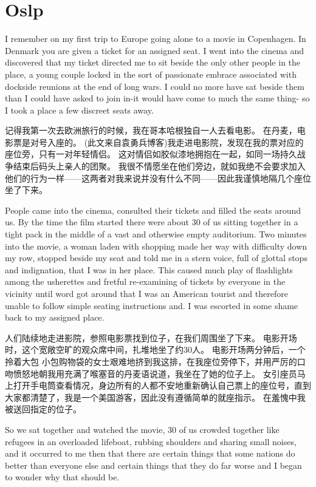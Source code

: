\documentclass[cs4size, a4paper, 12pt]{article}
\newcounter{numpar}
\newcommand*{\newpar}{\numpar{}}
\begin{document}
	\section{Oslp}
	
	\setcounter{numpar}{0}
	
	\newpar I remember on my first trip to Europe going alone to a movie in Copenhagen. In Denmark you are given a ticket for an assigned seat. I went into the cinema and discovered that my ticket directed me to sit beside the only other people in the place, a young couple locked in the sort of passionate embrace associated with dockside reunions at the end of long wars. I could no more have sat beside them than I could have asked to join in-it would have come to much the same thing- so I took a place a few discreet seats away.
	
	记得我第一次去欧洲旅行的时候，我在哥本哈根独自一人去看电影。 在丹麦，电影票是对号入座的。 (此文来自袁勇兵博客)我走进电影院，发现在我的票对应的座位旁，只有一对年轻情侣。 这对情侣如胶似漆地拥抱在一起，如同一场持久战争结束后码头上亲人的团聚。 我很不情愿坐在他们旁边，就如我绝不会要求加入他们的行为一样——这两者对我来说并没有什么不同——因此我谨慎地隔几个座位坐了下来。 
	
	\newpar People came into the cinema, consulted their tickets and filled the seats around us. By the time the film started there were about 30 of us sitting together in a tight pack in the middle of a vast and otherwise empty auditorium. Two minutes into the movie, a woman laden with shopping made her way with difficulty down my row, stopped beside my seat and told me in a stern voice, full of glottal stops and indignation, that I was in her place. This caused much play of flashlights among the usherettes and fretful re-examining of tickets by everyone in the vicinity until word got around that I was an American tourist and therefore unable to follow simple seating instructions and. I was escorted in some shame back to my assigned place.
	
	人们陆续地走进影院，参照电影票找到位子，在我们周围坐了下来。 电影开场时，这个宽敞空旷的观众席中间，扎堆地坐了约30人。 电影开场两分钟后，一个拎着大包 小包购物袋的女士艰难地挤到我这排，在我座位旁停下，并用严厉的口吻愤怒地朝我用充满了喉塞音的丹麦语说道，我坐在了她的位子上。 女引座员马上打开手电筒查看情况，身边所有的人都不安地重新确认自己票上的座位号，直到大家都清楚了，我是一个美国游客，因此没有遵循简单的就座指示。 在羞愧中我被送回指定的位子。 
	
	\newpar So we sat together and watched the movie, 30 of us crowded together like refugees in an overloaded lifeboat, rubbing shoulders and sharing small noises, and it occurred to me then that there are certain things that some nations do better than everyone else and certain things that they do far worse and I began to wonder why that should be.
	
\end{document}
